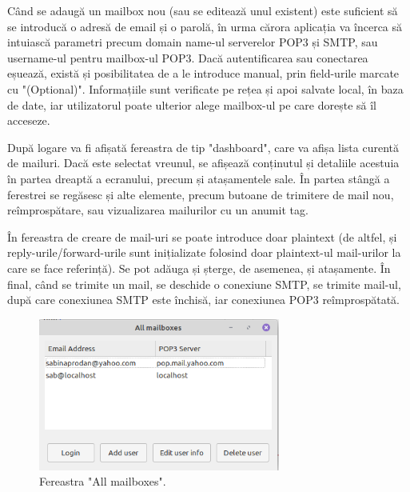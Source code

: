 \documentclass[runningheads]{llncs}
\begin{document}
Când se adaugă un mailbox nou (sau se editează unul existent) este suficient să se introducă o adresă de email și o parolă, în urma cărora aplicația va încerca să intuiască parametri precum domain name-ul serverelor POP3 și SMTP, sau username-ul pentru mailbox-ul POP3. Dacă autentificarea sau conectarea eșuează, există și posibilitatea de a le introduce manual, prin field-urile marcate cu "(Optional)". Informațiile sunt verificate pe rețea și apoi salvate local, în baza de date, iar utilizatorul poate ulterior alege mailbox-ul pe care dorește să îl acceseze.

După logare va fi afișată fereastra de tip "dashboard", care va afișa lista curentă de mailuri. Dacă este selectat vreunul, se afișează conținutul și detaliile acestuia în partea dreaptă a ecranului, precum și atașamentele sale. În partea stângă a ferestrei se regăsesc și alte elemente, precum butoane de trimitere de mail nou, reîmprospătare, sau vizualizarea mailurilor cu un anumit tag.

În fereastra de creare de mail-uri se poate introduce doar plaintext (de altfel, și reply-urile/forward-urile sunt inițializate folosind doar plaintext-ul mail-urilor la care se face referință). Se pot adăuga și șterge, de asemenea, și atașamente. În final, când se trimite un mail, se deschide o conexiune SMTP, se trimite mail-ul, după care conexiunea SMTP este închisă, iar conexiunea POP3 reîmprospătată.

\begin{figure}
    \centering
    \includegraphics[width={300px}]{allMailboxes.png}
    \caption{Fereastra "All mailboxes".}
    \label{fig:allMailboxes}
\end{figure}
\end{document}
